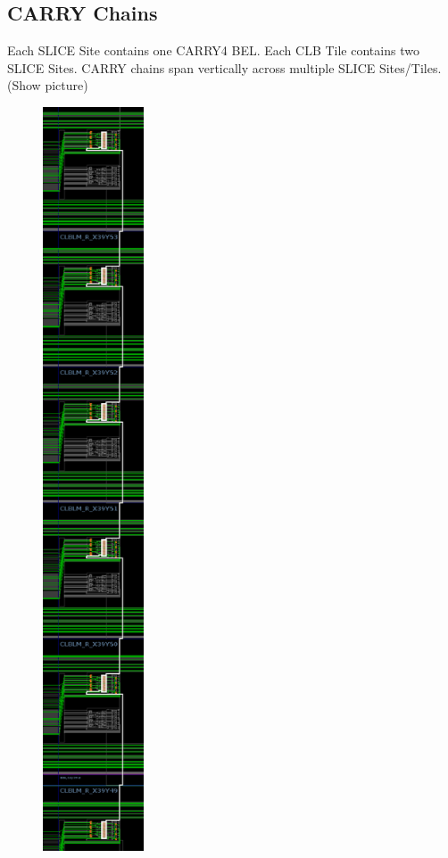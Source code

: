 \documentclass[twocolumn]{article}
\begin{document}
        \subsection{CARRY Chains}
            Each SLICE Site contains one CARRY4 BEL.
            Each CLB Tile contains two SLICE Sites.
            CARRY chains span vertically across multiple SLICE Sites/Tiles. (Show picture)
            \begin{figure}
                \centering
                \includegraphics[width=3.0cm]{figures/carry_chain_routes.png}

\end{figure}
\end{document}
